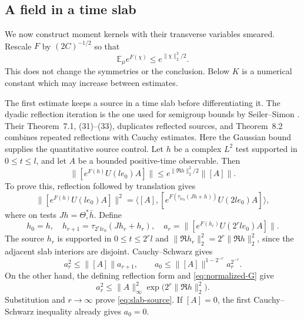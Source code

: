 \documentclass[11pt, letterpaper, reqno]{amsart}
\theoremstyle{definition}
\theoremstyle{remark}
\newcommand{\bbE}{\mathbb{E}}
\begin{document}
\subsection{A field in a time slab}\label{subsec:slab}

We now construct moment kernels with their transverse variables
smeared. Rescale $F$ by $(2C)^{-1/2}$ so that
\begin{equation}\label{eq:normalized-G}
 \bbE_\mu e^{F(\chi)}\leq e^{\|\chi\|_2^2/2}.
\end{equation}
This does not change the symmetries or the conclusion. Below $K$ is
a numerical constant which may increase between estimates.

The first estimate keeps a source in a time slab before differentiating
it. The dyadic reflection iteration is the one used for semigroup bounds
by Seiler--Simon \cite[Theorem~4.3, (23)--(24)]{SeilerSimon}. Their
Theorem~7.1, (31)--(33), duplicates reflected sources, and Theorem~8.2
combines repeated reflections with Cauchy estimates. Here the Gaussian
bound supplies the quantitative source control. Let $h$ be a complex $L^2$ test supported in $0\leq t\leq l$,
and let $A$ be a bounded positive-time observable. Then
\begin{equation}\label{eq:slab-source}
 \|[e^{F(h)}U(le_0)A]\|\leq e^{\|\Re h\|_2^2/2}\|[A]\|.
\end{equation}
To prove this, reflection followed by translation gives
\begin{equation}
 \|[e^{F(h)}U(le_0)A]\|^2
 =\big\langle[A],[e^{F(\tau_{le_0}(Jh+h))}U(2le_0)A]\big\rangle,
\end{equation}
where on tests $Jh=\Theta_\circ^*\bar h$. Define
\begin{equation}
 h_0=h,\quad h_{r+1}=\tau_{2^rle_0}(Jh_r+h_r),\quad
 a_r=\|[e^{F(h_r)}U(2^rle_0)A]\|.
\end{equation}
The source $h_r$ is supported in $0\leq t\leq2^rl$ and
$\|\Re h_r\|_2^2=2^r\|\Re h\|_2^2$, since the adjacent slab interiors
are disjoint. Cauchy--Schwarz gives
\begin{equation}
 a_r^2\leq\|[A]\|a_{r+1},\qquad
 a_0\leq\|[A]\|^{1-2^{-r}}a_r^{2^{-r}}.
\end{equation}
On the other hand, the defining reflection form and
\eqref{eq:normalized-G} give
\begin{equation}
 a_r^2\leq\|A\|_\infty^2
       \exp\bigl(2^r\|\Re h\|_2^2\bigr).
\end{equation}
Substitution and $r\to\infty$ prove \eqref{eq:slab-source}.
If $[A]=0$, the first Cauchy--Schwarz inequality already gives $a_0=0$.
\end{document}

